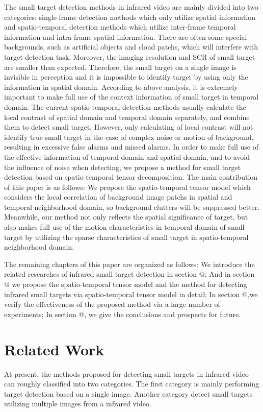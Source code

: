 \documentclass[journal]{IEEEtran}
\makeatletter
\newcommand{\Rmnum}[1]{\expandafter\@slowromancap\romannumeral #1@}
\makeatother
\begin{document}
The small target detection methods in infrared video are mainly divided into two categories: single-frame detection methods which only utilize spatial information and spatio-temporal detection methods which utilize inter-frame temporal information and intra-frame spatial information\cite{li2016novel}. There are often some special backgrounds, such as artificial objects and cloud patchs, which will interfere with target detection task. Moreover, the imaging resolution and SCR of small target are smaller than expected. Therefore, the small target on a single image is invisible in perception and it is impossible to identify target by using only the information in spatial domain. According to above analysis, it is extremely important to make full use of the context information of small target in temporal domain. The current spatio-temporal detection methods usually calculate the local contrast of spatial domain and temporal domain separately, and combine them to detect small target. However, only calculating of local contrast will not identify true small target in the case of complex noise or motion of background, resulting in excessive false alarms and missed alarms. In order to make full use of the effective information of temporal domain and spatial domain, and to avoid the influence of noise when detecting, we propose a method for small target detection based on spatio-temporal tensor decomposition. The main contribution of this paper is as follows: We propose the spatio-temporal tensor model which considers the local correlation of background image patchs in spatial and temporal neighborhood domain, so background clutters will be suppressed better. Meanwhile, our method not only reflects the spatial significance of target, but also makes full use of the motion characteristics in temporal domain of small target by utilizing the sparse characteristics of small target in spatio-temporal neighborhood domain.

The remaining chapters of this paper are organized as follows: We introduce the related researches of infrared small target detection in section \Rmnum{2}; And in section \Rmnum{3} we propose the spatio-temporal tensor model and the method for detecting infrared small targets via spatio-temporal tensor model in detail; In section \Rmnum{4},we verify the effectiveness of the proposed method via a large number of experiments; In section \Rmnum{5}, we give the conclusions and prospects for future.

%
%
\section{Related Work}
At present, the methods proposed for detecting small targets in infrared video can roughly classified into two categories. The first category is mainly performing target detection based on a single image. Another category detect small targets utilizing multiple images from a infrared video.
\end{document}
